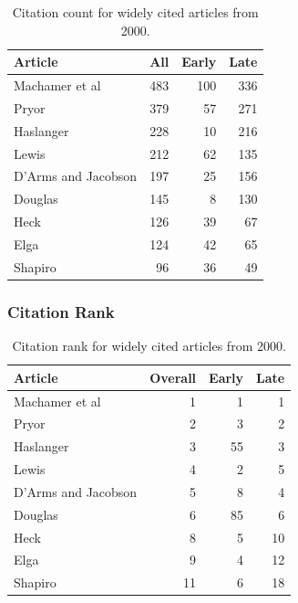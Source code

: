 \documentclass[
  10pt,
  letterpaper,
  DIV=11,
  numbers=noendperiod,
  twoside]{scrartcl}
\begin{document}
\begin{longtable}[]{@{}lrrr@{}}

\caption{\label{tbl-citation-count-2000}Citation count for widely cited
articles from 2000.}

\tabularnewline

\toprule\noalign{}
Article & All & Early & Late \\
\midrule\noalign{}
\endhead
\bottomrule\noalign{}
\endlastfoot
Machamer et al & 483 & 100 & 336 \\
Pryor & 379 & 57 & 271 \\
Haslanger & 228 & 10 & 216 \\
Lewis & 212 & 62 & 135 \\
D'Arms and Jacobson & 197 & 25 & 156 \\
Douglas & 145 & 8 & 130 \\
Heck & 126 & 39 & 67 \\
Elga & 124 & 42 & 65 \\
Shapiro & 96 & 36 & 49 \\

\end{longtable}

\subsubsection*{Citation Rank}\label{sec-rank-2000}

\begin{longtable}[]{@{}lrrr@{}}

\caption{\label{tbl-citation-rank-2000}Citation rank for widely cited
articles from 2000.}

\tabularnewline

\toprule\noalign{}
Article & Overall & Early & Late \\
\midrule\noalign{}
\endhead
\bottomrule\noalign{}
\endlastfoot
Machamer et al & 1 & 1 & 1 \\
Pryor & 2 & 3 & 2 \\
Haslanger & 3 & 55 & 3 \\
Lewis & 4 & 2 & 5 \\
D'Arms and Jacobson & 5 & 8 & 4 \\
Douglas & 6 & 85 & 6 \\
Heck & 8 & 5 & 10 \\
Elga & 9 & 4 & 12 \\
Shapiro & 11 & 6 & 18 \\

\end{longtable}
\end{document}
